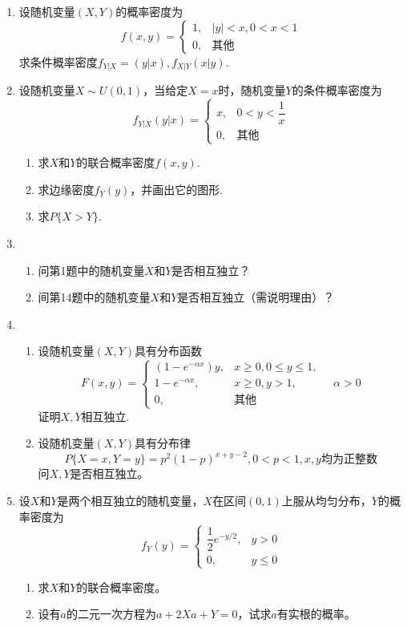 \documentclass[10pt,a4paper]{article}
\begin{document}
\begin{enumerate}
     \item 设随机变量$(X,Y)$的概率密度为
     $$f(x,y)=\left\{\begin{array}{ll}
         1, & |y|<x,0<x<1\\
         0, & \mbox{其他}
     \end{array}\right.$$
     求条件概率密度$f_{Y|X}=(y|x),f_{X|Y}(x|y)$.


     \item 设随机变量$X\sim U(0,1)$，当给定$X=x$时，随机变量$Y$的条件概率密度为
     $$f_{Y|X}(y|x)=\left\{\begin{array}{ll}
         x, & 0<y<\dfrac{1}{x} \\
         0, & \mbox{其他}
     \end{array}\right.$$
     \begin{enumerate}
         \item 求$X$和$Y$的联合概率密度$f(x,y)$.
         \item 求边缘密度$f_Y(y)$，并画出它的图形.
         \item 求$P\{X>Y\}$.
     \end{enumerate}


     \item \begin{enumerate}
         \item 问第1题中的随机变量$X$和$Y$是否相互独立？
         \item 间第14题中的随机变量$X$和$Y$是否相互独立（需说明理由）？
     \end{enumerate}


     \item \begin{enumerate}
         \item 设随机变量$(X,Y)$具有分布函数
         $$F(x,y)=\left\{\begin{array}{ll}
             (1-e^{-\alpha x})y, & x\geq 0,0\leq y \leq 1,\\
             1-e^{-\alpha x}, & x\geq 0,y>1,\\
             0, & \mbox{其他}
         \end{array}\right.\quad \alpha>0$$
         证明$X,Y$相互独立.
         \item 设随机变量$(X,Y)$具有分布律
         $$P\{X=x,Y=y\}=p^2(1-p)^{x+y-2},0<p<1,x,y\mbox{均为正整数}$$
         问$X,Y$是否相互独立。
     \end{enumerate}



     \item 设$X$和$Y$是两个相互独立的随机变量，$X$在区间$(0,1)$上服从均匀分布，$Y$的概率密度为
     $$f_Y(y)=\left\{\begin{array}{ll}
         \dfrac{1}{2} e^{-y/2}, & y>0\\
         0, & y\leq 0
     \end{array}\right.$$
     \begin{enumerate}
         \item 求$X$和$Y$的联合概率密度。
         \item 设有$a$的二元一次方程为$a+2Xa+Y=0$，试求$a$有实根的概率。
     \end{enumerate}




\end{enumerate}
\end{document}
